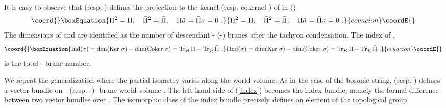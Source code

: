 \documentclass[a4paper,12pt]{article}
\begin{document}
It is easy to observe that \myHighlight{$\Pi$}\coordHE{} (resp. \myHighlight{$\bar\Pi$}\coordHE{}) defines 
the projection to the kernel \coordHE{} (resp. cokernel \coordHE{}) of 
\myHighlight{$\sigma$}\coordHE{} in \myHighlight{$\cH$}\coordHE{} (\myHighlight{$\bar\cH$}\coordHE{})
\begin{equation}\coord{}\boxEquation{
 \Pi^2=\Pi,\quad
 \bar\Pi^2=\bar\Pi,\quad
 \Pi\bar\sigma = \bar\Pi\sigma =0\,\,.
}{
 \Pi^2=\Pi,\quad
 \bar\Pi^2=\bar\Pi,\quad
 \Pi\bar\sigma = \bar\Pi\sigma =0\,\,.
}{ecuacion}\coordE{}\end{equation}
The dimensions of \coordHE{} and
\coordHE{} are identified as the number of 
descendant \coordHE{}-\coordHE{} (\coordHE{}-\coordHE{})
branes after the tachyon condensation. The index of \myHighlight{$\sigma$}\coordHE{},
\begin{equation}\coord{}\boxEquation{\label{index}
\mbox{Ind}(\sigma)=\mbox{dim}(\mbox{Ker }\sigma)
-\mbox{dim}(\mbox{Coker }\sigma)=
\mbox{Tr}_{\cH}\,\Pi -\mbox{Tr}_{\bar\cH}\,\bar\Pi\,\,.
}{\mbox{Ind}(\sigma)=\mbox{dim}(\mbox{Ker }\sigma)
-\mbox{dim}(\mbox{Coker }\sigma)=
\mbox{Tr}_{\cH}\,\Pi -\mbox{Tr}_{\bar\cH}\,\bar\Pi\,\,.
}{ecuacion}\coordE{}\end{equation}
is the total \coordHE{}-\coordHE{} brane number.

We repeat the generalization where the partial isometry \myHighlight{$\sigma$}\coordHE{}
varies along the world volume.
As in the case of the bosonic string,
\myHighlight{$\Pi$}\coordHE{} (resp. \myHighlight{$\bar\Pi$}\coordHE{}) defines a vector bundle on
\coordHE{}- (resp. \coordHE{}-) \coordHE{}-brane world volume \coordHE{}. 
The left hand side of (\ref{index}) 
becomes the index bundle, namely the formal difference
between two vector bundles \coordHE{} over \coordHE{}.
The isomorphic class of the index bundle precisely
defines an element of the topological \coordHE{} group.
\end{document}
